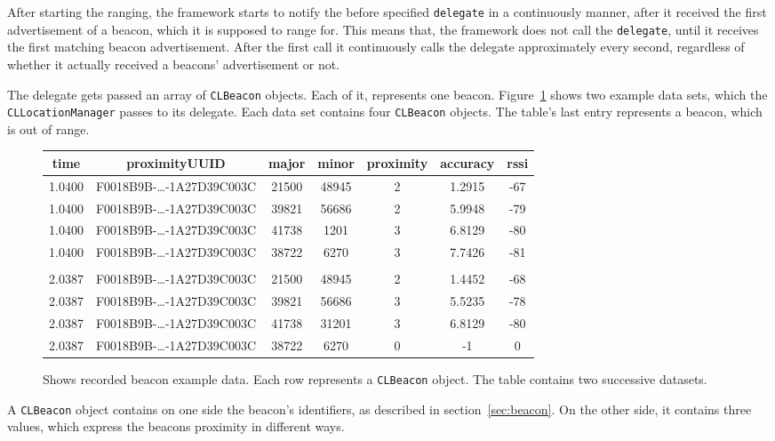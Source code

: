 After starting the ranging, the framework starts to notify the before specified \texttt{delegate} in a continuously manner, after it received the first advertisement of a beacon, which it is supposed to range for. This means that, the framework does not call the \texttt{delegate}, until it receives the first matching beacon advertisement. After the first call it continuously calls the delegate approximately every second, regardless of whether it actually received a beacons' advertisement or not.

The delegate gets passed an array of \texttt{CLBeacon} objects. Each of it, represents one beacon. Figure~\ref{fig:beaconExampleData} shows two example data sets, which the \texttt{CLLocationManager} passes to its delegate. Each data set contains four \texttt{CLBeacon} objects. The table's last entry represents a beacon, which is out of range.

\begin{figure}
\begin{tabular}{*{7}{c}}
time & proximityUUID & major & minor & proximity & accuracy & rssi \\
\hline
1.0400 & F0018B9B-\dots-1A27D39C003C & 21500 & 48945 & 2 & 1.2915 & -67\\
1.0400 & F0018B9B-\dots-1A27D39C003C & 39821 & 56686 & 2 & 5.9948 & -79\\
1.0400 & F0018B9B-\dots-1A27D39C003C & 41738 & 1201 & 3 & 6.8129 & -80\\
1.0400 & F0018B9B-\dots-1A27D39C003C & 38722 & 6270 & 3 & 7.7426 & -81\\
 & & & & & & \\
2.0387 & F0018B9B-\dots-1A27D39C003C & 21500 & 48945 & 2 & 1.4452 & -68\\
2.0387 & F0018B9B-\dots-1A27D39C003C & 39821 & 56686 & 3 & 5.5235 & -78\\
2.0387 & F0018B9B-\dots-1A27D39C003C & 41738 & 31201 & 3 & 6.8129 & -80\\
2.0387 & F0018B9B-\dots-1A27D39C003C & 38722 & 6270 & 0 & -1 & 0\\
\end{tabular}
\caption{Shows recorded beacon example data. Each row represents a \texttt{CLBeacon} object. The table contains two successive datasets.}
\label{fig:beaconExampleData}
\end{figure}

A \texttt{CLBeacon} object contains on one side the beacon's identifiers, as described in section~\ref{sec:beacon}. On the other side, it contains three values, which express the beacons proximity in different ways.

